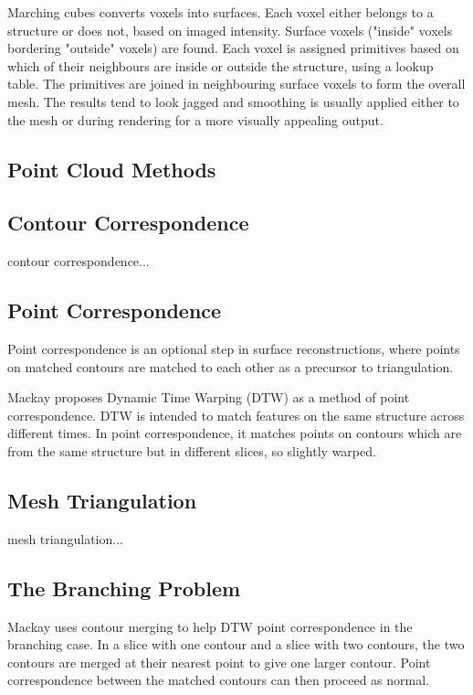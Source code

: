 \documentclass[acmsmall]{acmart}
\begin{document}
Marching cubes \cite{lorensen1987marching} converts voxels into surfaces. Each voxel either belongs to a structure or does not, based on imaged intensity. Surface voxels ("inside" voxels bordering "outside" voxels) are found. Each voxel is assigned primitives based on which of their neighbours are inside or outside the structure, using a lookup table. The primitives are joined in neighbouring surface voxels to form the overall mesh. The results tend to look jagged and smoothing is usually applied either to the mesh or during rendering for a more visually appealing output.

\subsection{Point Cloud Methods}


\subsection{Contour Correspondence}
contour correspondence...

\subsection{Point Correspondence}
Point correspondence is an optional step in surface reconstructions, where points on matched contours are matched to each other as a precursor to triangulation.

Mackay \cite{mackay2019robust} proposes Dynamic Time Warping (DTW) as a method of point correspondence. DTW is intended to match features on the same structure across different times. In point correspondence, it matches points on contours which are from the same structure but in different slices, so slightly warped. 

\subsection{Mesh Triangulation}
mesh triangulation...

\subsection{The Branching Problem}

Mackay \cite{mackay2019robust} uses contour merging to help DTW point correspondence in the branching case. In a slice with one contour and a slice with two contours, the two contours are merged at their nearest point to give one larger contour. Point correspondence between the matched contours can then proceed as normal.
\end{document}
